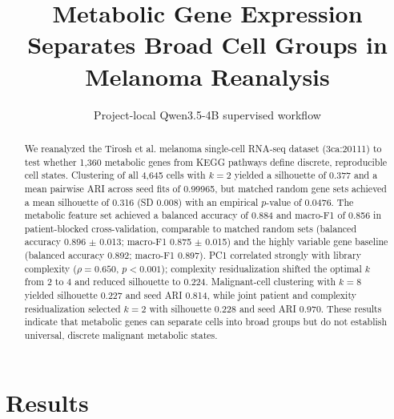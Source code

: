 \documentclass[10pt]{article}
\title{Metabolic Gene Expression Separates Broad Cell Groups in Melanoma Reanalysis}
\author{Project-local Qwen3.5-4B supervised workflow}
\date{}
\begin{document}
\maketitle

\begin{abstract}
We reanalyzed the Tirosh et al. melanoma single-cell RNA-seq dataset (3ca:20111) to test whether 1,360 metabolic genes from KEGG pathways define discrete, reproducible cell states. Clustering of all 4,645 cells with $k=2$ yielded a silhouette of 0.377 and a mean pairwise ARI across seed fits of 0.99965, but matched random gene sets achieved a mean silhouette of 0.316 (SD 0.008) with an empirical $p$-value of 0.0476. The metabolic feature set achieved a balanced accuracy of 0.884 and macro-F1 of 0.856 in patient-blocked cross-validation, comparable to matched random sets (balanced accuracy 0.896 $\pm$ 0.013; macro-F1 0.875 $\pm$ 0.015) and the highly variable gene baseline (balanced accuracy 0.892; macro-F1 0.897). PC1 correlated strongly with library complexity ($\rho = 0.650$, $p < 0.001$); complexity residualization shifted the optimal $k$ from 2 to 4 and reduced silhouette to 0.224. Malignant-cell clustering with $k=8$ yielded silhouette 0.227 and seed ARI 0.814, while joint patient and complexity residualization selected $k=2$ with silhouette 0.228 and seed ARI 0.970. These results indicate that metabolic genes can separate cells into broad groups but do not establish universal, discrete malignant metabolic states.
\end{abstract}





\section{Results}


\clearpage

\clearpage







\end{document}

